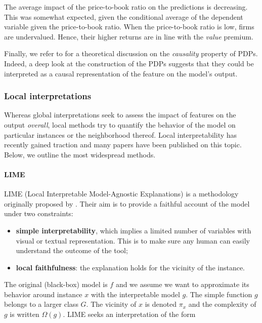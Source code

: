 The average impact of the price-to-book ratio on the predictions is decreasing. This was somewhat expected, given the conditional average of the dependent variable given the price-to-book ratio. When the price-to-book ratio is low, firms are undervalued. Hence, their higher returns are in line with the \textit{value} premium.

Finally, we refer to \cite{zhao2019causal} for a theoretical discussion on the \textit{causality} property of PDPs. Indeed, a deep look at the construction of the PDPs suggests that they could be interpreted as a causal representation of the feature on the model's output.

\subsubsection{Local interpretations}

Whereas global interpretations seek to assess the impact of features on the output \textit{overall}, local methods try to quantify the behavior of the model on particular instances or the neighborhood thereof. Local interpretability has recently gained traction and many papers have been published on this topic. Below, we outline the most widespread methods.

\paragraph{LIME}

LIME (Local Interpretable Model-Agnostic Explanations) is a methodology originally proposed by \cite{ribeiro2016should}. Their aim is to provide a faithful account of the model under two constraints:

\begin{itemize}
\item \textbf{simple interpretability}, which implies a limited number of variables with visual or textual representation. This is to make sure any human can easily understand the outcome of the tool;
\item \textbf{local faithfulness}: the explanation holds for the vicinity of the instance.
\end{itemize}

The original (black-box) model is $f$ and we assume we want to approximate its behavior around instance $x$ with the interpretable model $g$. The simple function $g$ belongs to a larger class $G$. The vicinity of $x$ is denoted $\pi_x$ and the complexity of $g$ is written $\Omega(g)$. LIME seeks an interpretation of the form


